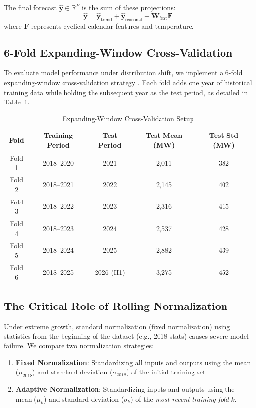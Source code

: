 \documentclass[journal]{IEEEtran}
\begin{document}
The final forecast $\hat{\mathbf{y}} \in \mathbb{R}^{F}$ is the sum of these projections:
\begin{equation}
\hat{\mathbf{y}} = \hat{\mathbf{y}}_{\text{trend}} + \hat{\mathbf{y}}_{\text{seasonal}} + \mathbf{W}_{\text{feat}} \mathbf{F}
\end{equation}
where $\mathbf{F}$ represents cyclical calendar features and temperature.

\subsection{6-Fold Expanding-Window Cross-Validation}
To evaluate model performance under distribution shift, we implement a 6-fold expanding-window cross-validation strategy \cite{hyndman2021}. Each fold adds one year of historical training data while holding the subsequent year as the test period, as detailed in Table~\ref{tab:cv_setup}.

\begin{table}[htbp]
\caption{Expanding-Window Cross-Validation Setup}
\label{tab:cv_setup}
\centering
\begin{tabular}{ccccc}
\toprule
\textbf{Fold} & \textbf{Training Period} & \textbf{Test Period} & \textbf{Test Mean (MW)} & \textbf{Test Std (MW)} \\
\midrule
Fold 1 & 2018--2020 & 2021 & 2,011 & 382 \\
Fold 2 & 2018--2021 & 2022 & 2,145 & 402 \\
Fold 3 & 2018--2022 & 2023 & 2,316 & 415 \\
Fold 4 & 2018--2023 & 2024 & 2,537 & 428 \\
Fold 5 & 2018--2024 & 2025 & 2,882 & 439 \\
Fold 6 & 2018--2025 & 2026 (H1) & 3,275 & 452 \\
\bottomrule
\end{tabular}
\end{table}

\subsection{The Critical Role of Rolling Normalization}
Under extreme growth, standard normalization (fixed normalization) using statistics from the beginning of the dataset (e.g., 2018 stats) causes severe model failure. We compare two normalization strategies:
\begin{enumerate}
    \item \textbf{Fixed Normalization}: Standardizing all inputs and outputs using the mean ($\mu_{2018}$) and standard deviation ($\sigma_{2018}$) of the initial training set.
    \item \textbf{Adaptive Normalization}: Standardizing inputs and outputs using the mean ($\mu_k$) and standard deviation ($\sigma_k$) of the \textit{most recent training fold} $k$.
\end{enumerate}
\end{document}
